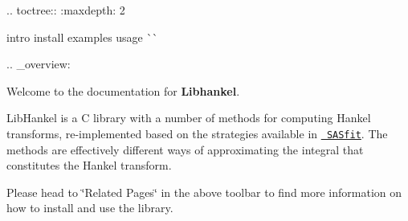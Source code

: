 \label{index_md_docs_index}%
%


.. toctree\+:\+: \+:maxdepth\+: 2

intro install examples usage \`{}\`{}

.. \+\_\+overview\+:

Welcome to the documentation for {\bfseries{Libhankel}}.

Lib\+Hankel is a C library with a number of methods for computing Hankel transforms, re-\/implemented based on the strategies available in \href{https://github.com/SASfit/SASfit}{\texttt{ SASfit}}. The methods are effectively different ways of approximating the integral that constitutes the Hankel transform.

Please head to \char`\"{}\+Related Pages\char`\"{} in the above toolbar to find more information on how to install and use the library. 